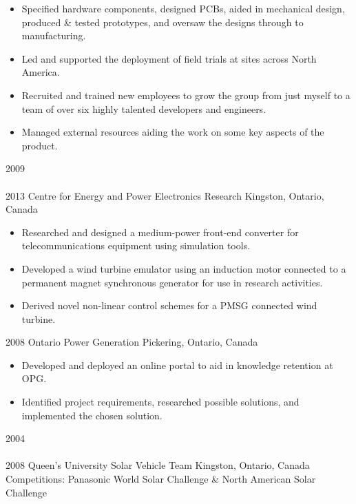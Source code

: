 \begin{entrylist}
{\begin{itemize}[leftmargin=12pt]
	\item Specified hardware components, designed PCBs, aided in mechanical design, produced \& tested prototypes, and oversaw the designs through to manufacturing.
  \item Led and supported the deployment of field trials at sites across North America.
	\item Recruited and trained new employees to grow the group from just myself to a team of over six highly talented developers and engineers.
	\item Managed external resources aiding the work on some key aspects of the product.
\end{itemize}
}
\entry
  {2009\\\faChevronDown\\2013}
  {Centre for Energy and Power Electronics Research}
  {Kingston, Ontario, Canada}
  {
  \begin{itemize}[leftmargin=12pt]
    \item Researched and designed a medium-power front-end converter for telecommunications equipment using simulation tools.
    \item Developed a wind turbine emulator using an induction motor connected to a permanent magnet synchronous generator for use in research activities.
    \item Derived novel non-linear control schemes for a PMSG connected wind turbine.
  \end{itemize}}
\entry
  {2008}
  {Ontario Power Generation}
  {Pickering, Ontario, Canada}
  {
  \begin{itemize}[leftmargin=12pt]
    \item Developed and deployed an online portal to aid in knowledge retention at OPG.
    \item Identified project requirements, researched possible solutions, and implemented the chosen solution.
  \end{itemize}
}
\entry
  {2004\\\faChevronDown\\2008}
  {Queen's University Solar Vehicle Team}
  {Kingston, Ontario, Canada}
  {\\
  Competitions: {\bodyfontit Panasonic World Solar Challenge} \&
  {\bodyfontit North American Solar Challenge}
}
\end{entrylist}
